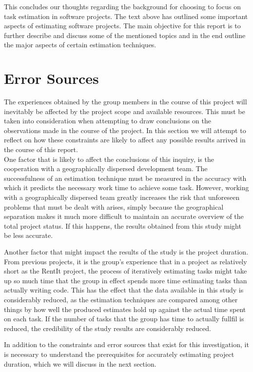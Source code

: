 This concludes our thoughts regarding the background for choosing to focus on task estimation in software projects. The text above has outlined some important aspects of estimating software projects. The main objective for this report is to further describe and discuss some of the mentioned topics and in the end outline the major aspects of certain estimation techniques.

\section{Error Sources}
The experiences obtained by the group members in the course of this project will inevitably be affected by the project scope and available resources. This must be taken into consideration when attempting to draw conclusions on the observations made in the course of the project. In this section we will attempt to reflect on how these constraints are likely to affect any possible results arrived in the course of this report.\\
One factor that is likely to affect the conclusions of this inquiry, is the cooperation with a geographically dispersed development team. The successfulness of an estimation technique must be measured in the accuracy with which it predicts the necessary work time to achieve some task. However, working with a geographically dispersed team greatly increases the risk that unforeseen problems that must be dealt with arises, simply because the geographical separation makes it much more difficult to maintain an accurate overview of the total project status. If this happens, the results obtained from this study might be less accurate.

Another factor that might impact the results of the study is the project duration. From previous projects, it is the group's experience that in a project as relatively short as the RentIt project, the process of iteratively estimating tasks might take up so much time that the group in effect spends more time estimating tasks than actually writing code. This has the effect that the data available in this study is considerably reduced, as the estimation techniques are compared among other things by how well the produced estimates hold up against the actual time spent on each task. If the number of tasks that the group has time to actually fullfil is reduced, the credibility of the study results are considerably reduced.

In addition to the constraints and error sources that exist for this investigation, it is necessary to understand the prerequisites for accurately estimating project duration, which we will discuss in the next section.


